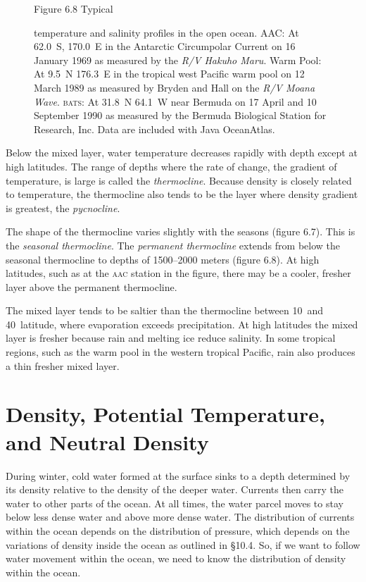 \begin{figure}[t!]
\footnotesize
Figure 6.8 Typical \rule{0mm}{4ex}temperature and salinity profiles in
the open ocean. AAC: At 62.0\degrees\ S, 170.0\degrees\ E in the
Antarctic Circumpolar Current on
16 January 1969 as measured by the \textit{R/V Hakuho Maru}. Warm
Pool: At 9.5\degrees\ N 176.3\degrees\ E in the tropical west Pacific
warm pool on 12 March 1989 as measured by Bryden and Hall on the
\textit{R/V Moana Wave}.  \textsc{bats}: At 31.8\degrees\ N
64.1\degrees\ W near Bermuda on 17 April and 10 September 1990 as
measured by the Bermuda Biological Station for Research, Inc.  Data
are included with Java OceanAtlas.
\label{fig:TandSProfile}
\vspace{-5ex}
\end{figure}

Below the mixed layer, water
temperature decreases rapidly with depth except at high latitudes. The
range of depths where the rate of change, the gradient of temperature,
is large is called the
\textit{thermocline}. Because density is
closely related to temperature, the thermocline also tends to be the
layer where density gradient is greatest, the
\textit{pycnocline}.

The shape of the thermocline varies slightly with the seasons (figure 6.7).
This is the \textit{seasonal thermocline}.
 The \textit{permanent thermocline}
extends from below the seasonal
thermocline to depths of 1500--2000 meters (figure 6.8). At high
latitudes, such as at the \textsc{aac} station in the figure, there
may be a cooler, fresher layer above the permanent thermocline.

The mixed layer tends to be saltier than the
thermocline between 10\degrees\ and
40\degrees\ latitude, where evaporation exceeds precipitation. At high
latitudes the mixed layer is fresher
because rain and melting ice reduce salinity. In some tropical
regions, such as the warm pool in the western tropical Pacific, rain
also produces a thin fresher mixed layer.

\section[Density]{Density, Potential Temperature, and Neutral Density}
During winter, cold water formed at the surface sinks to a depth
determined by its density relative to the density of the deeper
water. Currents then carry the water to other parts of the ocean. At
all times, the water parcel moves to stay below less dense water and
above more dense water. The distribution of currents within the ocean
depends on the distribution of pressure, which depends on the
variations of density inside the ocean as outlined in \S10.4. So, if
we want to follow water movement within the ocean, we need to know the
distribution of density within the ocean.

